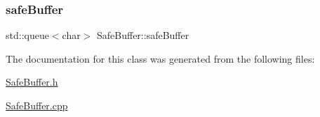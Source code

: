 \mbox{\label{class_safe_buffer_a8db738cc1b4be3eeba47f322008a2c3e}} 
\subsubsection{\texorpdfstring{safe\+Buffer}{safeBuffer}}
{\footnotesize\ttfamily std\+::queue$<$char$>$ Safe\+Buffer\+::safe\+Buffer}



The documentation for this class was generated from the following files\+:\begin{DoxyCompactItemize}
\item 
\mbox{\hyperlink{_safe_buffer_8h}{Safe\+Buffer.\+h}}\item 
\mbox{\hyperlink{_safe_buffer_8cpp}{Safe\+Buffer.\+cpp}}\end{DoxyCompactItemize}
